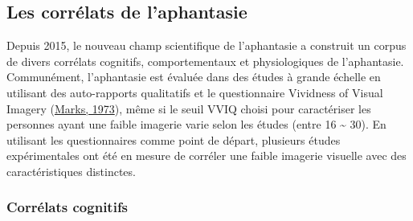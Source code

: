 \documentclass[
  12pt,
]{article}
\begin{document}
\hypertarget{les-corruxe9lats-de-laphantasie}{%
\subsection{Les corrélats de
l'aphantasie}\label{les-corruxe9lats-de-laphantasie}}

Depuis 2015, le nouveau champ scientifique de l'aphantasie a construit
un corpus de divers corrélats cognitifs, comportementaux et
physiologiques de l'aphantasie. Communément, l'aphantasie est évaluée
dans des études à grande échelle en utilisant des auto-rapports
qualitatifs et le questionnaire Vividness of Visual Imagery
(\protect\hyperlink{ref-marksVividnessVisualImagery1973}{Marks, 1973}),
même si le seuil VVIQ choisi pour caractériser les personnes ayant une
faible imagerie varie selon les études (entre 16 \textasciitilde{} 30).
En utilisant les questionnaires comme point de départ, plusieurs études
expérimentales ont été en mesure de corréler une faible imagerie
visuelle avec des caractéristiques distinctes.

\hypertarget{corruxe9lats-cognitifs}{%
\subsubsection{Corrélats cognitifs}\label{corruxe9lats-cognitifs}}
\end{document}
